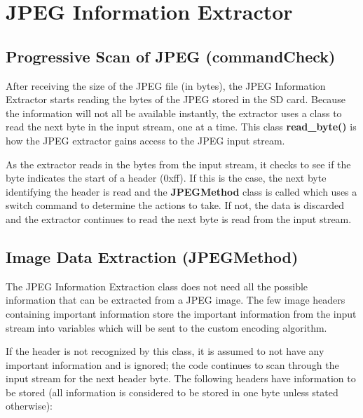 \section{JPEG Information Extractor}

\subsection{Progressive Scan of JPEG (commandCheck)}

After receiving the size of the JPEG file (in bytes), 
the JPEG Information Extractor starts reading the bytes of the JPEG stored in the SD card. 
Because the information will not all be available instantly, 
the extractor uses a class to read the next byte in the input stream, one at a time. This class \textbf{read\_byte()} is 
how the JPEG extractor gains access to the JPEG input stream. 

As the extractor reads in the bytes from the input stream, it checks to see if the byte indicates the start of a header (0xff). 
If this is the case, the next byte identifying the header is read and the \textbf{JPEGMethod} class is 
called which uses a switch command to determine the actions to take. 
If not, the data is discarded and the extractor continues to read the next byte is read from the input stream. 

\subsection{Image Data Extraction (JPEGMethod)}

The JPEG Information Extraction class does not need all the possible information that can be extracted from a JPEG image. 
The few image headers containing important information store the important information from the input stream into 
variables which will be sent to the custom encoding algorithm. 

If the header is not recognized by this class, 
it is assumed to not have any important information and is ignored; 
the code continues to scan through the input stream for the next header byte. 
The following headers have  information to be stored (all information is considered to be stored in one byte unless stated otherwise):

